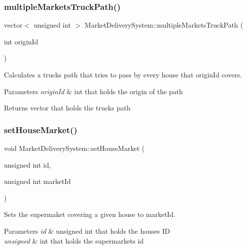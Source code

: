 \subsubsection{\texorpdfstring{multiple\+Markets\+Truck\+Path()}{multipleMarketsTruckPath()}}
{\footnotesize\ttfamily vector$<$ unsigned int $>$ Market\+Delivery\+System\+::multiple\+Markets\+Truck\+Path (\begin{DoxyParamCaption}\item[{int}]{origin\+Id }\end{DoxyParamCaption})}



Calculates a truck\textquotesingle{}s path that tries to pass by every house that origin\+Id covers. 


\begin{DoxyParams}{Parameters}
{\em origin\+Id} & int that holds the origin of the path \\
\hline
\end{DoxyParams}
\begin{DoxyReturn}{Returns}
vector that holds the truck\textquotesingle{}s path 
\end{DoxyReturn}
\hypertarget{class_market_delivery_system_a2f72e9abcf4e6f7f36ebb58fbc54dc3f}{}\label{class_market_delivery_system_a2f72e9abcf4e6f7f36ebb58fbc54dc3f} 
\subsubsection{\texorpdfstring{set\+House\+Market()}{setHouseMarket()}}
{\footnotesize\ttfamily void Market\+Delivery\+System\+::set\+House\+Market (\begin{DoxyParamCaption}\item[{unsigned int}]{id,  }\item[{unsigned int}]{market\+Id }\end{DoxyParamCaption})}



Sets the supermaket covering a given house to market\+Id. 


\begin{DoxyParams}{Parameters}
{\em id} & unsigned int that holds the house\textquotesingle{}s ID \\
\hline
{\em unsigned} & int that holds the supermarket\textquotesingle{}s id \\
\hline
\end{DoxyParams}
\hypertarget{class_market_delivery_system_a2f7b0dea30ea078b085dc04ac7086059}{}\label{class_market_delivery_system_a2f7b0dea30ea078b085dc04ac7086059} 
